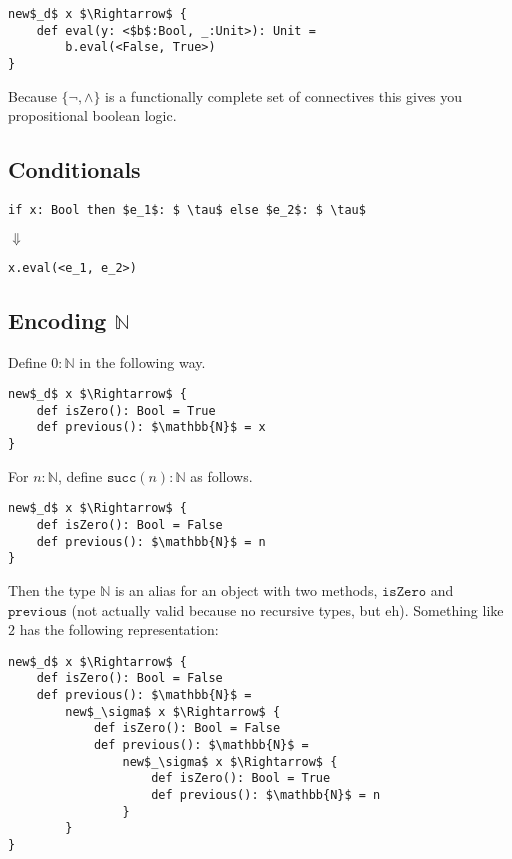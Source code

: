 \documentclass{llncs}
\newcommand{\keywadj}[1]{\mathtt{#1}}
\newcommand{\kwa}[1]{\keywadj{ #1 }}
\begin{document}
\begin{lstlisting}
new$_d$ x $\Rightarrow$ {
    def eval(y: <$b$:Bool, _:Unit>): Unit =
        b.eval(<False, True>)
}
\end{lstlisting}

\noindent
Because $\{ \neg, \land \}$ is a functionally complete set of connectives this gives you propositional boolean logic.

\subsection{Conditionals}

\begin{lstlisting}
if x: Bool then $e_1$: $ \tau$ else $e_2$: $ \tau$
\end{lstlisting}

$\Downarrow$

\begin{lstlisting}
x.eval(<e_1, e_2>)
\end{lstlisting}

\subsection{Encoding $\mathbb{N}$}

Define $0 : \mathbb{N}$ in the following way.

\begin{lstlisting}
new$_d$ x $\Rightarrow$ {
    def isZero(): Bool = True
    def previous(): $\mathbb{N}$ = x
}
\end{lstlisting}

\noindent
For $n : \mathbb{N}$, define $\kwa{succ}(n): \mathbb{N}$ as follows.

\begin{lstlisting}
new$_d$ x $\Rightarrow$ {
    def isZero(): Bool = False
    def previous(): $\mathbb{N}$ = n
}
\end{lstlisting}

\noindent
Then the type $\mathbb{N}$ is an alias for an object with two methods, $\kwa{isZero}$ and $\kwa{previous}$ (not actually valid because no recursive types, but eh). Something like $2$ has the following representation:

\begin{lstlisting}
new$_d$ x $\Rightarrow$ {
    def isZero(): Bool = False
    def previous(): $\mathbb{N}$ =
        new$_\sigma$ x $\Rightarrow$ {
            def isZero(): Bool = False
            def previous(): $\mathbb{N}$ =
                new$_\sigma$ x $\Rightarrow$ {
                    def isZero(): Bool = True
                    def previous(): $\mathbb{N}$ = n
                }
        }
}
\end{lstlisting}
\end{document}
